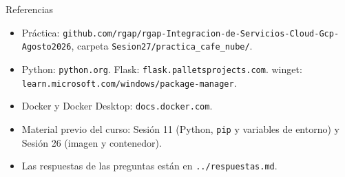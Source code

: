 \documentclass[aspectratio=169,10pt,c]{beamer}
\begin{document}
\begin{frame}{Referencias}
\scriptsize
\begin{itemize}\setlength\itemsep{4pt}
  \item Práctica: \texttt{github.com/rgap/rgap-Integracion-de-Servicios-Cloud-Gcp-Agosto2026}, carpeta \texttt{Sesion27/practica\_cafe\_nube/}.
  \item Python: \texttt{python.org}. Flask: \texttt{flask.palletsprojects.com}. winget: \texttt{learn.microsoft.com/windows/package-manager}.
  \item Docker y Docker Desktop: \texttt{docs.docker.com}.
  \item Material previo del curso: Sesión 11 (Python, \texttt{pip} y variables de entorno) y Sesión 26 (imagen y contenedor).
  \item Las respuestas de las preguntas están en \texttt{../respuestas.md}.
\end{itemize}
\end{frame}
\end{document}
